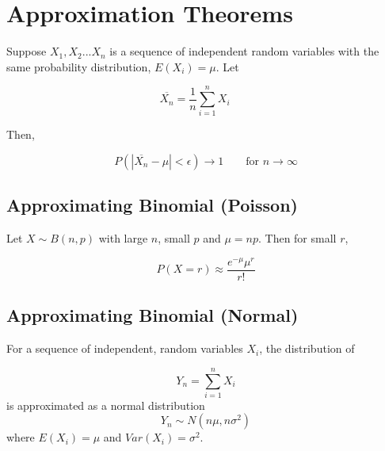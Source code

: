 \section{Approximation Theorems} %
\label{sec:approximation_theorems}

Suppose $X_1, X_2 ...X_n$ is a sequence of independent random variables with the same probability distribution, $E(X_i) =\mu$. Let

\begin{equation}
  \overline{X_n} = \frac{1}{n}\sum_{i=1}^n X_i \qquad  
\end{equation}

Then,

\begin{equation}
  P(|\overline{X_n} - \mu| < \epsilon) \rightarrow 1 \qquad \text{for } n \rightarrow \infty
\end{equation}


\subsection{Approximating Binomial (Poisson)} %
\label{sub:approximating_binomial_}

Let $X \sim B(n,p)$ with large $n$, small $p$ and $\mu = np$. Then for small $r$,

\begin{equation}
  P(X=r) \approx \frac{e^{-\mu}\mu^r}{r!}
\end{equation}


\subsection{Approximating Binomial (Normal)} %
\label{sub:approximating_binomial_}

For a sequence of independent, random variables $X_i$, the distribution of

\begin{equation}
  Y_n = \sum_{i=1}^nX_i
\end{equation}
is approximated as a normal distribution
\begin{equation}
   Y_n \sim N(n \mu, n \sigma^2)
 \end{equation}
 where $E(X_i)=\mu$ and $Var(X_i) = \sigma^2$.


